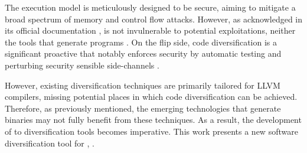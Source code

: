 The \wasm execution model is meticulously designed to be secure, aiming to mitigate a broad spectrum of memory and control flow attacks.
However, as acknowledged in its official documentation \cite{WebAssemblySecurity}, \wasm is not invulnerable to potential exploitations, neither the tools that generate \Wasm programs \cite{usenixWASM2020, stievenart2021security}.
On the flip side, code diversification is a significant proactive that notably enforces security by automatic testing and perturbing security sensible side-channels \cite{arteaga2020crow, MEWE, CABRERAARTEAGA2023103296}.


However, existing diversification techniques are primarily tailored for LLVM compilers, missing potential places in which code diversification can be achieved.
Therefore, as previously mentioned, the emerging technologies that generate \wasm binaries may not fully benefit from these techniques.
As a result, the development of \Wasm to \Wasm diversification tools becomes imperative.
This work presents a new software diversification tool for \Wasm, \tool.







